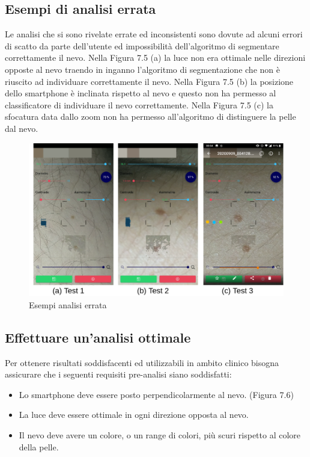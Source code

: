 {\subsection{Esempi di analisi errata}
Le analisi che si sono rivelate errate ed inconsistenti sono dovute ad alcuni errori di scatto da parte dell'utente ed impossibilità dell'algoritmo di segmentare correttamente il nevo.
\newline
Nella Figura 7.5 (a) la luce non era ottimale nelle direzioni opposte al nevo traendo in inganno l'algoritmo di segmentazione che non è riuscito ad individuare correttamente il nevo.
\newline
Nella Figura 7.5 (b) la posizione dello smartphone è inclinata rispetto al nevo e questo non ha permesso al classificatore di individuare il nevo correttamente.
\newline
Nella Figura 7.5 (c) la sfocatura data dallo zoom non ha permesso all'algoritmo di distinguere la pelle dal nevo.
\begin{figure}[h]
	\begin{center}
		\includegraphics[scale=0.4]{figure/capitolo7/test5.png}
	\end{center}
	\caption{Esempi analisi errata }	
\end{figure}
\newpage
\subsection{Effettuare un'analisi ottimale}
Per ottenere risultati soddisfacenti ed utilizzabili in ambito clinico bisogna assicurare che i seguenti requisiti pre-analisi siano soddisfatti:
\begin{itemize}
	\item Lo smartphone deve essere posto perpendicolarmente al nevo. (Figura 7.6)
	\item La luce deve essere ottimale in ogni direzione opposta al nevo.
	\item Il nevo deve avere un colore, o un range di colori, più scuri rispetto al colore della pelle.
\end{itemize}

}

